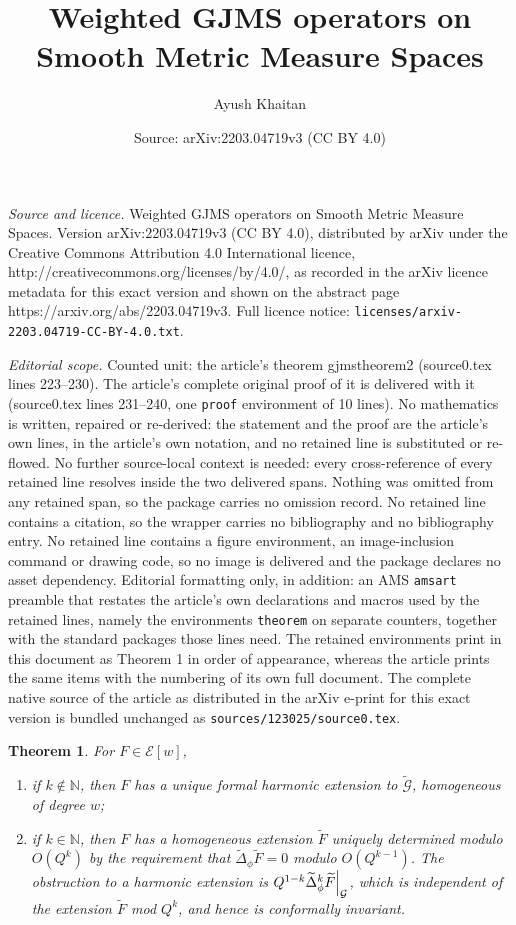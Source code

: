 \documentclass[10pt,a4paper]{amsart}
\title{Weighted GJMS operators on Smooth Metric Measure Spaces}
\author{Ayush Khaitan}
\date{Source: arXiv:2203.04719v3 (CC BY 4.0)}
\newtheorem{theorem}{Theorem}
\newcommand\restr[2]{{%
  \left.\kern-\nulldelimiterspace %
  #1 %
  \right|_{#2} %
  }}
\begin{document}
\maketitle

\noindent\emph{Source and licence.} Weighted GJMS operators on Smooth Metric Measure Spaces. Version arXiv:2203.04719v3 (CC BY 4.0), distributed by arXiv under the Creative Commons Attribution 4.0 International licence, http://creativecommons.org/licenses/by/4.0/, as recorded in the arXiv licence metadata for this exact version and shown on the abstract page https://arxiv.org/abs/2203.04719v3. Full licence notice: \texttt{licenses/arxiv-2203.04719-CC-BY-4.0.txt}.\par\smallskip

\noindent\textit{Editorial scope.} Counted unit: the article's theorem gjmstheorem2 (source0.tex lines 223--230). The article's complete original proof of it is delivered with it (source0.tex lines 231--240, one \texttt{proof} environment of 10 lines). No mathematics is written, repaired or re-derived: the statement and the proof are the article's own lines, in the article's own notation, and no retained line is substituted or re-flowed.  No further source-local context is needed: every cross-reference of every retained line resolves inside the two delivered spans.  Nothing was omitted from any retained span, so the package carries no omission record.  No retained line contains a citation, so the wrapper carries no bibliography and no bibliography entry.  No retained line contains a figure environment, an image-inclusion command or drawing code, so no image is delivered and the package declares no asset dependency.  Editorial formatting only, in addition: an AMS \texttt{amsart} preamble that restates the article's own declarations and macros used by the retained lines, namely the environments \texttt{theorem} on separate counters, together with the standard packages those lines need.  The retained environments print in this document as Theorem 1 in order of appearance, whereas the article prints the same items with the numbering of its own full document.  The complete native source of the article as distributed in the arXiv e-print for this exact version is bundled unchanged as \texttt{sources/123025/source0.tex}.
\begin{theorem}
\label{gjmstheorem2}
For $F\in\mathcal{E}[w]$,
\begin{enumerate}
\item if $k\notin\mathbb{N}$, then $F$ has a unique formal harmonic extension to $\widetilde{\mathcal{G}}$, homogeneous of degree $w$;
\item if $k\in\mathbb{N}$, then $F$ has a homogeneous extension $\widetilde{F}$ uniquely determined modulo $O(Q^k)$ by the requirement that $\widetilde{\Delta}_\phi\widetilde{F}=0$ modulo $O(Q^{k-1})$. The obstruction to a harmonic extension is $\restr{Q^{1-k}\widetilde{\Delta}_\phi^k\widetilde{F}}{{\mathcal{G}}}$, which is independent of the extension $\widetilde{F}$ mod $Q^k$, and hence is conformally invariant.
\end{enumerate}
\end{theorem}
\end{document}
